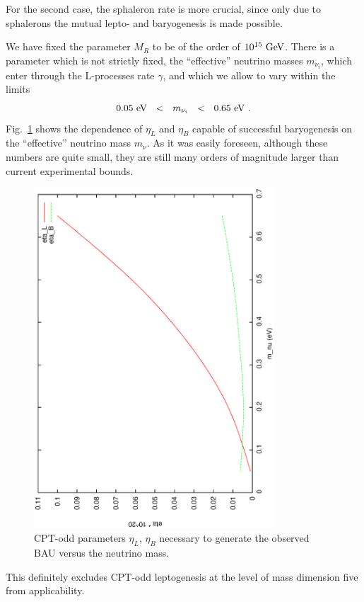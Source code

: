 \documentclass[12pt]{revtex4}
\newcommand{\GeV}{{\rm GeV}}
\newcommand{\eV}{{\rm eV}}
\begin{document}
	For the second case, the sphaleron rate is more crucial, since
	only due to sphalerons the mutual lepto- and baryogenesis is
	made possible. 
	

	We have fixed the parameter $ M_R $ to be of the order of 
	$ 10^{15}~\GeV $.
	There is a parameter which is not strictly fixed,
	the ``effective'' neutrino masses $ m_{\nu_i} $, which enter 
	through the
	L-processes rate $ \gamma $,
	and which we allow to vary within the limits 
\[
	0.05~\eV ~~<~~ m_{\nu_i} ~~<~~0.65~\eV~.
\]
	Fig.~\ref{scan_fig} shows the dependence of $ \eta_L $ and 
	$ \eta_B $ capable
	of successful baryogenesis on the ``effective'' neutrino mass
	$ m_\nu $.
	As it was easily foreseen, although these numbers are quite
	small, they are still many orders of magnitude larger than
	current experimental bounds.
\begin{figure}
\includegraphics[width=9cm,angle=270]{scan.ps}
\caption{CPT-odd parameters $ \eta_L $, $ \eta_B $ necessary to generate
	the observed BAU versus the neutrino mass.}
\label{scan_fig}
\end{figure}
	This definitely excludes CPT-odd leptogenesis at the level of
	mass dimension five from applicability.
\end{document}

